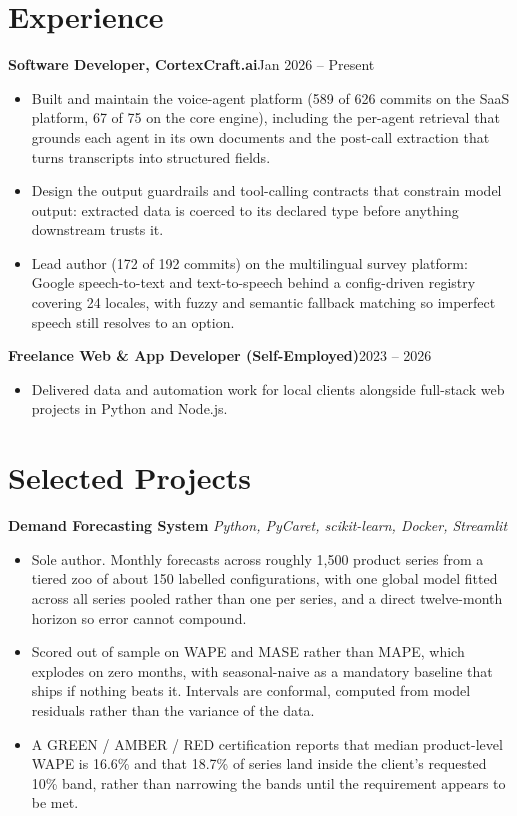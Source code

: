 \documentclass[10pt,a4paper]{article}
\newcommand{\entry}[2]{\textbf{#1}\hfill{#2}\par}
\begin{document}
\section{Experience}
\entry{Software Developer, CortexCraft.ai}{Jan 2026 -- Present}
\begin{itemize}
  \item Built and maintain the voice-agent platform (589 of 626 commits on the SaaS platform, 67 of 75
        on the core engine), including the per-agent retrieval that grounds each agent in its own
        documents and the post-call extraction that turns transcripts into structured fields.
  \item Design the output guardrails and tool-calling contracts that constrain model output:
        extracted data is coerced to its declared type before anything downstream trusts it.
  \item Lead author (172 of 192 commits) on the multilingual survey platform: Google speech-to-text
        and text-to-speech behind a config-driven registry covering 24 locales, with fuzzy and
        semantic fallback matching so imperfect speech still resolves to an option.
\end{itemize}

\vspace{1pt}
\entry{Freelance Web \& App Developer (Self-Employed)}{2023 -- 2026}
\begin{itemize}
  \item Delivered data and automation work for local clients alongside full-stack web projects in Python and Node.js.
\end{itemize}

\section{Selected Projects}
\textbf{Demand Forecasting System} \textit{Python, PyCaret, scikit-learn, Docker, Streamlit}
\begin{itemize}
  \item Sole author. Monthly forecasts across roughly 1,500 product series from a tiered zoo of about
        150 labelled configurations, with one global model fitted across all series pooled rather
        than one per series, and a direct twelve-month horizon so error cannot compound.
  \item Scored out of sample on WAPE and MASE rather than MAPE, which explodes on zero months, with
        seasonal-naive as a mandatory baseline that ships if nothing beats it. Intervals are
        conformal, computed from model residuals rather than the variance of the data.
  \item A GREEN / AMBER / RED certification reports that median product-level WAPE is 16.6\% and that
        18.7\% of series land inside the client's requested 10\% band, rather than narrowing the
        bands until the requirement appears to be met.
\end{itemize}
\end{document}
